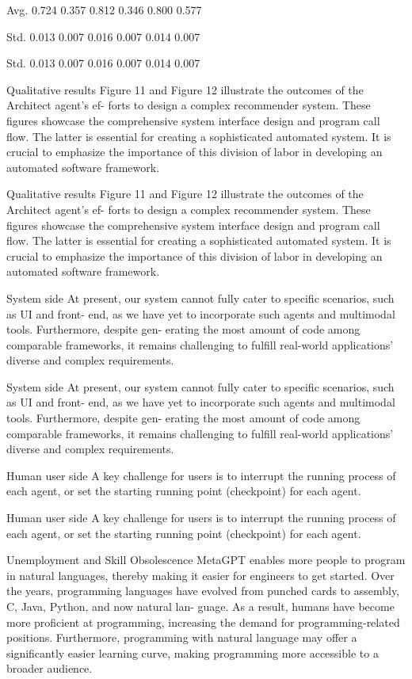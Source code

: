 \documentclass[12pt]{article}
\begin{document}
Avg.
0.724
0.357
0.812
0.346
0.800
0.577


Std.
0.013
0.007
0.016
0.007
0.014
0.007


Std.
0.013
0.007
0.016
0.007
0.014
0.007


Qualitative results Figure 11 and Figure 12 illustrate the outcomes of the Architect agent’s ef-
forts to design a complex recommender system. These figures showcase the comprehensive system
interface design and program call flow. The latter is essential for creating a sophisticated automated
system. It is crucial to emphasize the importance of this division of labor in developing an automated
software framework.


Qualitative results Figure 11 and Figure 12 illustrate the outcomes of the Architect agent’s ef-
forts to design a complex recommender system. These figures showcase the comprehensive system
interface design and program call flow. The latter is essential for creating a sophisticated automated
system. It is crucial to emphasize the importance of this division of labor in developing an automated
software framework.


System side At present, our system cannot fully cater to specific scenarios, such as UI and front-
end, as we have yet to incorporate such agents and multimodal tools. Furthermore, despite gen-
erating the most amount of code among comparable frameworks, it remains challenging to fulfill
real-world applications’ diverse and complex requirements.


System side At present, our system cannot fully cater to specific scenarios, such as UI and front-
end, as we have yet to incorporate such agents and multimodal tools. Furthermore, despite gen-
erating the most amount of code among comparable frameworks, it remains challenging to fulfill
real-world applications’ diverse and complex requirements.


Human user side A key challenge for users is to interrupt the running process of each agent, or
set the starting running point (checkpoint) for each agent.


Human user side A key challenge for users is to interrupt the running process of each agent, or
set the starting running point (checkpoint) for each agent.


Unemployment and Skill Obsolescence MetaGPT enables more people to program in natural
languages, thereby making it easier for engineers to get started. Over the years, programming
languages have evolved from punched cards to assembly, C, Java, Python, and now natural lan-
guage. As a result, humans have become more proficient at programming, increasing the demand
for programming-related positions. Furthermore, programming with natural language may offer a
significantly easier learning curve, making programming more accessible to a broader audience.
\end{document}
